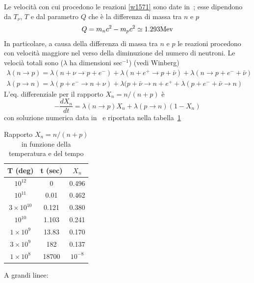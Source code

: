 Le velocità con cui procedono le reazioni \eqref{w1571} sono date
in~\textcite{weinberg:gravitation}; esse dipendono da $T_{\nu}$, $T$ e dal
parametro $Q$ che è la differenza di massa tra $n$ e $p$
\begin{equation}
  Q= m_n c^2 - m_p c^2 \simeq 1.293 {\rm Mev}
\end{equation}
In particolare, a causa della differenza di massa tra $n$ e $p$ le reazioni
procedono con velocità maggiore nel verso della diminuzione del numero di
neutroni.  Le velocià totali sono ($\lambda$ ha dimensioni sec$^{-1}$) (vedi
Winberg)
\begin{subequations}
  \begin{gather}
    \lambda (n \to p) = \lambda (n + \nu \to p + e^-) + \lambda (n + e^+ \to p +
    {\bar \nu}) + \lambda (n \to p + e^- +{\bar \nu }) \\
    \lambda (p \to n) = \lambda (p + e^- \to n + \nu ) + \lambda (p + {\bar \nu}
    \to n + e^+ + \lambda (p + e^- +{\bar \nu} \to n)
  \end{gather}
\end{subequations}
L'eq. differenziale per il rapporto $X_n= n/(n+p)$ è
\begin{equation}
  -\frac{dX_n}{dt} =  \lambda (n \to p) X_n + \lambda (p \to n) (1-X_n)
\end{equation}
con soluzione numerica data in~\textcite[549]{weinberg:gravitation} e riportata
nella tabella~\ref{X_nvsT}
\begin{table}
  \centering{}
  \caption{Rapporto $X_n=n/(n+p)$ in funzione della temperatura e del tempo}
  \label{X_nvsT}
  \begin{tabular}{ccc}
    \toprule
    T (deg)            & t (sec)    & $X_n$ \\
    \midrule
    $10^{12} $           & 0         & 0.496 \\
    $10^{11}  $          & 0.01      & 0.462 \\
    $3 \times  10^{10}$  & 0.121     & 0.380 \\
    $10^{10}   $         & 1.103     & 0.241 \\
    $1  \times 10^{9}$   &  13.83    & 0.170 \\
    $3  \times 10^{9}$   &  182      & 0.137 \\
    $1  \times 10^{8}$   &  18700    & $10^{-8}$ \\
    \bottomrule
  \end{tabular}
\end{table}
A grandi linee:
